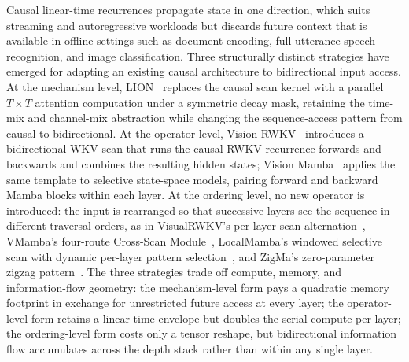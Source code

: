 Causal linear-time recurrences propagate state in one direction,
which suits streaming and autoregressive workloads but discards
future context that is available in offline settings such as
document encoding, full-utterance speech recognition, and image
classification. Three structurally distinct strategies have
emerged for adapting an existing causal architecture to
bidirectional input access. At the mechanism level,
LION~\cite{afzal2025linear} replaces the causal scan kernel with
a parallel $T \times T$ attention computation under a symmetric
decay mask, retaining the time-mix and channel-mix abstraction
while changing the sequence-access pattern from causal to
bidirectional. At the operator level,
Vision-RWKV~\cite{duan2024visionrwkv} introduces a bidirectional
WKV scan that runs the causal RWKV recurrence forwards and
backwards and combines the resulting hidden states; Vision
Mamba~\cite{zhu2024visionmamba} applies the same template to
selective state-space models, pairing forward and backward Mamba
blocks within each layer. At the ordering level, no new operator
is introduced: the input is rearranged so that successive layers
see the sequence in different traversal orders, as in
VisualRWKV's per-layer scan alternation~\cite{hou2024visualrwkv},
VMamba's four-route Cross-Scan Module~\cite{liu2024vmamba},
LocalMamba's windowed selective scan with dynamic per-layer
pattern selection~\cite{huang2024localmamba}, and ZigMa's
zero-parameter zigzag pattern~\cite{hu2024zigma}. The three
strategies trade off compute, memory, and information-flow
geometry: the mechanism-level form pays a quadratic memory
footprint in exchange for unrestricted future access at every
layer; the operator-level form retains a linear-time envelope but
doubles the serial compute per layer; the ordering-level form
costs only a tensor reshape, but bidirectional information flow
accumulates across the depth stack rather than within any single
layer.

